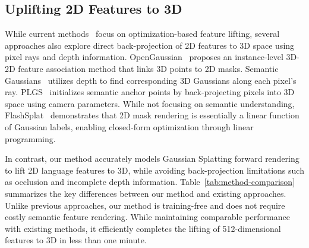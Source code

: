 \subsection*{Uplifting 2D Features to 3D} 
While current methods~\cite{qin2024langsplat,shi2024language,peng20243d, kobayashi2022decomposing} focus on optimization-based feature lifting, several approaches also explore direct back-projection of 2D features to 3D space using pixel rays and depth information.
OpenGaussian~\cite{wu2024opengaussian} proposes an instance-level 3D-2D feature association method that links 3D points to 2D masks. Semantic Gaussians~\cite{guo2024semantic} utilizes depth to find corresponding 3D Gaussians along each pixel's ray. PLGS~\cite{wang2024plgsrobustpanopticlifting} initializes semantic anchor points by back-projecting pixels into 3D space using camera parameters. While not focusing on semantic understanding, FlashSplat~\cite{flashsplat} demonstrates that 2D mask rendering is essentially a linear function of Gaussian labels, enabling closed-form optimization through linear programming. 

In contrast, our method accurately models Gaussian Splatting forward rendering to lift 2D language features to 3D, while avoiding back-projection limitations such as occlusion and incomplete depth information. Table~\ref{tab:method-comparison} summarizes the key differences between our method and existing approaches. Unlike previous approaches, our method is training-free and does not require costly semantic feature rendering. While maintaining comparable performance with existing methods, it efficiently completes the lifting of 512-dimensional features to 3D in less than one minute.